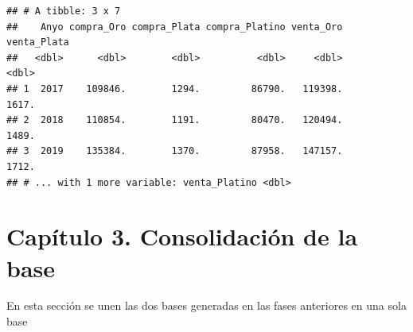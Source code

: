 \documentclass[
  11pt,
  a4paper,
]{book}
\newenvironment{Shaded}{\begin{snugshade}}{\end{snugshade}}
\newcommand{\DataTypeTok}[1]{\textcolor[rgb]{0.13,0.29,0.53}{#1}}
\newcommand{\KeywordTok}[1]{\textcolor[rgb]{0.13,0.29,0.53}{\textbf{#1}}}
\newcommand{\NormalTok}[1]{#1}
\newcommand{\OperatorTok}[1]{\textcolor[rgb]{0.81,0.36,0.00}{\textbf{#1}}}
\newcommand{\StringTok}[1]{\textcolor[rgb]{0.31,0.60,0.02}{#1}}
\begin{document}
\begin{verbatim}
## # A tibble: 3 x 7
##    Anyo compra_Oro compra_Plata compra_Platino venta_Oro venta_Plata
##   <dbl>      <dbl>        <dbl>          <dbl>     <dbl>       <dbl>
## 1  2017    109846.        1294.         86790.   119398.       1617.
## 2  2018    110854.        1191.         80470.   120494.       1489.
## 3  2019    135384.        1370.         87958.   147157.       1712.
## # ... with 1 more variable: venta_Platino <dbl>
\end{verbatim}

\begin{Shaded}
\end{Shaded}

\hypertarget{capuxedtulo-3.-consolidaciuxf3n-de-la-base}{%
\chapter{Capítulo 3. Consolidación de la
base}\label{capuxedtulo-3.-consolidaciuxf3n-de-la-base}}

En esta sección se unen las dos bases generadas en las fases anteriores
en una sola base
\end{document}
